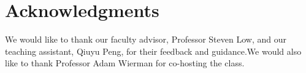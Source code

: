 \documentclass{acm_proc_article-sp}
\begin{document}
\section{Acknowledgments}
We would like to thank our faculty advisor, Professor Steven
Low, and our teaching assistant, Qiuyu Peng, for their feedback and guidance.We would also like to thank Professor Adam Wierman for co-hosting the class.

%

 
%
%

\end{document}

